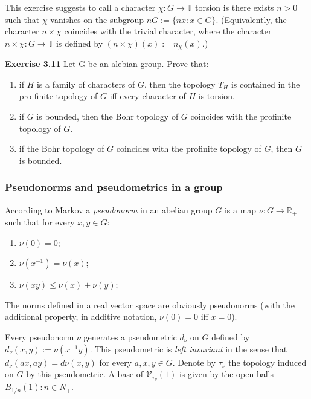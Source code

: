 \documentclass[12pt]{article}
\begin{document}
This exercise suggests to call a character $\chi : G \to \mathbb{T}$ torsion is there exists $n > 0$ such that $\chi$ vanishes on
the subgroup $nG := \{nx : x \in G\}$. (Equivalently, the character $n \times \chi$ coincides with the trivial character, where
the character $n \times \chi : G \to \mathbb{T}$ is defined by $(n \times \chi)(x) := n_{\chi}(x)$.)


\textbf{Exercise 3.11} Let G be an alebian group. Prove that:
    

    \begin{enumerate}
        
        \item  if $H$ is a family of characters of $G$, then the topology $T_H$ is contained in the pro-finite topology of $G$ iff
        every character of $H$ is torsion.            
        
        \item if $G$ is bounded, then the Bohr topology of $G$ coincides with the profinite topology of $G$.
        
        \item if the Bohr topology of $G$ coincides with the profinite topology of $G$, then $G$ is bounded.
    
    \end{enumerate}


\subsubsection{Pseudonorms and pseudometrics in a group}


    According to Markov a \emph{pseudonorm} in an abelian group $G$ is a map $\nu: G \to \mathbb{R}_+$ such that for every $x, y \in G$:


    \begin{enumerate}

        \item $\nu(0) = 0$;

        \item $\nu(x^{-1})=\nu(x)$;
        
        \item $\nu(xy) \leq \nu(x) + \nu(y)$;
        
    \end{enumerate}


    The norms defined in a real vector space are obviously pseudonorms (with the additional property, in additive
notation, $\nu(0) = 0$ iff $x = 0$).


    Every pseudonorm $\nu$ generates a pseudometric $d_\nu$ on $G$ defined by $d_\nu (x, y) := \nu(x^{-1} y)$. This pseudometric
is \emph{left invariant} in the sense that $d_\nu (ax, ay) = d\nu(x, y)$ for every $a, x, y \in G$. Denote by $\tau_\nu$ the topology induced
on $G$ by this pseudometric. A base of $\mathcal{V}_{\tau_\nu}(1)$ is given by the open balls ${B_{1/n}(1) : n \in N_+}$.
\end{document}
